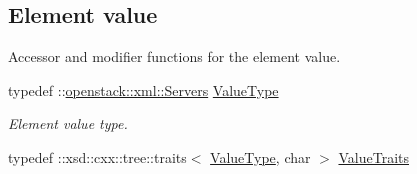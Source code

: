 \subsection*{Element value}
\label{_amgrp2ee2eae1a8c390ea033f241c027da8d6}
Accessor and modifier functions for the element value. \begin{DoxyCompactItemize}
\item 
\hypertarget{classopenstack_1_1xml_1_1Servers___ab5ebf83fae8d23969cd5ab97416d4ee5}{
typedef ::\hyperlink{classopenstack_1_1xml_1_1Servers}{openstack::xml::Servers} \hyperlink{classopenstack_1_1xml_1_1Servers___ab5ebf83fae8d23969cd5ab97416d4ee5}{ValueType}}
\label{classopenstack_1_1xml_1_1Servers___ab5ebf83fae8d23969cd5ab97416d4ee5}

\begin{DoxyCompactList}\small\item\em Element value type. \item\end{DoxyCompactList}\item 
\hypertarget{classopenstack_1_1xml_1_1Servers___a3864000c6101b51cb10121a3a6d9f46d}{
typedef ::xsd::cxx::tree::traits$<$ \hyperlink{classopenstack_1_1xml_1_1Servers}{ValueType}, char $>$ \hyperlink{classopenstack_1_1xml_1_1Servers___a3864000c6101b51cb10121a3a6d9f46d}{ValueTraits}}
\label{classopenstack_1_1xml_1_1Servers___a3864000c6101b51cb10121a3a6d9f46d}


\end{DoxyCompactItemize}
